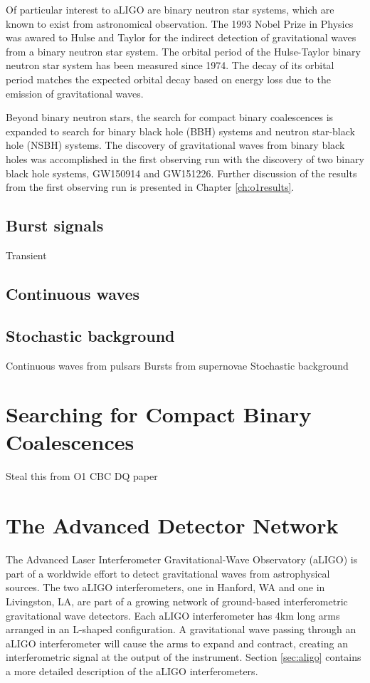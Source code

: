 Of particular interest to aLIGO are binary neutron star systems, 
which are known to exist from astronomical 
observation. The 1993 Nobel Prize in Physics was awared to Hulse and 
Taylor for the indirect detection of gravitational waves from a binary 
neutron star system. The orbital 
period of the Hulse-Taylor binary neutron star system has been measured 
since 1974. The decay of its orbital period matches the 
expected orbital decay based on energy loss due to the emission of 
gravitational waves. 

Beyond binary neutron stars, the search for compact binary coalescences 
is expanded to search for binary black hole (BBH) systems and neutron star-black 
hole (NSBH) systems. The discovery of gravitational waves from binary black holes 
was accomplished in the 
first observing run with the discovery of two binary black hole systems, GW150914 
and GW151226. Further discussion of the results from the first observing run is 
presented in Chapter \ref{ch:o1results}.

\subsection{Burst signals}

Transient 

\subsection{Continuous waves}


\subsection{Stochastic background}

Continuous waves from pulsars
Bursts from supernovae
Stochastic background


\section{Searching for Compact Binary Coalescences}\label{sec:cbc-search}

Steal this from O1 CBC DQ paper


\section{The Advanced Detector Network}

The Advanced Laser Interferometer Gravitational-Wave Observatory (aLIGO) is 
part of a worldwide effort to detect gravitational waves from astrophysical 
sources. The two aLIGO interferometers, one in Hanford, WA and one in 
Livingston, LA, are part of a growing network of ground-based interferometric 
gravitational wave detectors. Each aLIGO interferometer has 4km long arms 
arranged in an L-shaped configuration. A gravitational wave passing through 
an aLIGO interferometer will cause the arms to expand and contract, 
creating an interferometric signal at the output of the instrument. 
Section \ref{sec:aligo} contains a more detailed description of the aLIGO 
interferometers. 

